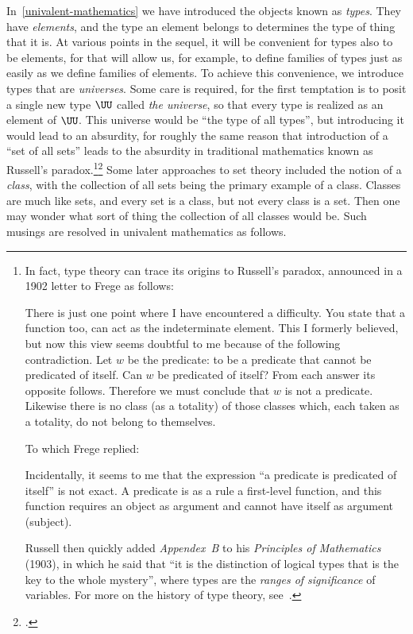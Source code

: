 In~\cref{univalent-mathematics} we have introduced the objects known as \emph{types}.  They have \emph{elements}, and the type an
element belongs to determines the type of thing that it is.  At various points in the sequel, it will be convenient for types also to be
elements, for that will allow us, for example, to define families of types just as easily as we define families of elements.  To achieve this
convenience, we introduce types that are \emph{universes}.  Some care is required, for the first temptation is to posit a
single new type $\UU$ called \emph{the universe}, so that every type is realized as an element of $\UU$.  This universe would be ``the type of
all types'', but introducing it would lead to an absurdity, for roughly the same reason that introduction of a ``set of all sets'' leads to the absurdity
in traditional mathematics known as Russell's paradox.\footnote{%
  In fact, type theory can trace its origins to Russell's paradox,
  announced in a 1902 letter to Frege as follows:\\
  \begin{adjustwidth}{\parindent}{}
    There is just one point where I have encountered a difficulty.
    You state that a function too, can act as the indeterminate element.
    This I formerly believed,
    but now this view seems doubtful to me because of the following contradiction.
    Let $w$ be the predicate: to be a predicate that cannot be predicated of itself.
    Can $w$ be predicated of itself? From each answer its opposite follows.
    Therefore we must conclude that $w$ is not a predicate.
    Likewise there is no class (as a totality) of those classes which,
    each taken as a totality, do not belong to themselves.
  \end{adjustwidth}
  To which Frege replied:
  \begin{adjustwidth}{\parindent}{}
  Incidentally, it seems to me that the expression
  ``a predicate is predicated of itself'' is not exact.
  A predicate is as a rule a first-level function,
  and this function requires an object as argument
  and cannot have itself as argument (subject).
  \end{adjustwidth}
  Russell then quickly added \emph{Appendex~B} to his
  \emph{Principles of Mathematics} (1903), in which he said that
  ``it is the distinction of logical types that is the key to the whole mystery'',
  where types are the \emph{ranges of significance} of variables.
  For more on the history of type theory,
  see~\citeauthor{sep-type-theory}\footnotemark{}.}\footcitetext{sep-type-theory}
  Some later approaches to set theory included the notion of a \emph{class}, with the collection of all sets being the primary example of a class.
  Classes are much like sets, and every set is a class, but not every class is a set.
  Then one may wonder what sort of thing the collection of all classes would be.  Such
  musings are resolved in univalent mathematics as follows.


